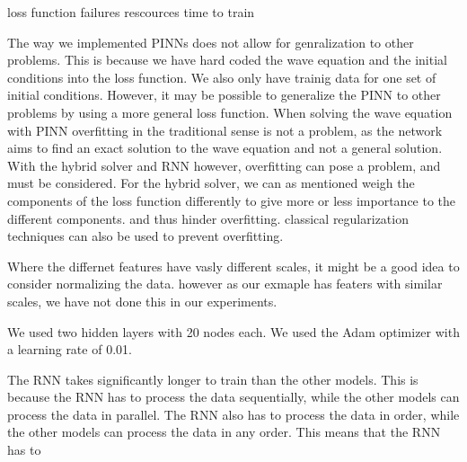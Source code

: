 \documentclass[twoside,11pt]{report}
\begin{document}
    loss function
    failures
    rescources
    time to train

    The way we implemented PINNs does not allow for genralization to other problems. This is because we have
    hard coded the wave equation and the initial conditions into the loss function. We also only have trainig data 
    for one set of initial conditions. However, 
    it may be possible to generalize the PINN 
    to other problems by using a more general loss function.
    When solving the wave equation with PINN overfitting in the traditional sense is not a problem, as the network
    aims to find an exact solution to the wave equation and not a general solution. With the hybrid solver and RNN
    however, overfitting  can pose a problem, and must be considered. For the hybrid solver, we can as mentioned
    weigh the components of the loss function differently to give more or less importance to the different components.
    and thus hinder overfitting. classical regularization techniques can also be used to prevent overfitting.



    Where the differnet features have vasly different scales, it might be a good idea to consider normalizing the data.
    however as our exmaple has featers with similar scales, we have not done this in our experiments.

    We used two hidden layers with 20 nodes each. We used the Adam optimizer with a learning rate of 0.01.

    The RNN takes significantly longer to train than the other models. This is because the RNN has to process
    the data sequentially, while the other models can process the data in parallel. The RNN also has to process
    the data in order, while the other models can process the data in any order. This means that the RNN has to
\end{document}
